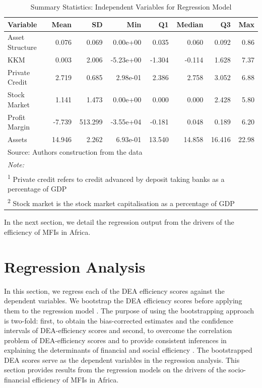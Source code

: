 \documentclass[a4paper, nobind]{templates/ociamthesis}
\begin{document}
\begin{table}

\caption{\label{tab:unnamed-chunk-123}Summary Statistics: Independent Variables for Regression Model}
\centering
\fontsize{9}{11}\selectfont
\begin{tabular}[t]{lrrrrrrr}
\toprule
Variable & Mean & SD & Min & Q1 & Median & Q3 & Max\\
\midrule
Asset Structure & 0.076 & 0.069 & 0.00e+00 & 0.035 & 0.060 & 0.092 & 0.86\\
KKM & 0.003 & 2.006 & -5.23e+00 & -1.304 & -0.114 & 1.628 & 7.37\\
Private Credit & 2.719 & 0.685 & 2.98e-01 & 2.386 & 2.758 & 3.052 & 6.88\\
Stock Market & 1.141 & 1.473 & 0.00e+00 & 0.000 & 0.000 & 2.428 & 5.80\\
Profit Margin & -7.739 & 513.299 & -3.55e+04 & -0.181 & 0.048 & 0.189 & 6.20\\
\addlinespace
Assets & 14.946 & 2.262 & 6.93e-01 & 13.540 & 14.858 & 16.416 & 22.98\\
\bottomrule
\multicolumn{8}{l}{\rule{0pt}{1em}Source: Authors construction from the data}\\
\multicolumn{8}{l}{\rule{0pt}{1em}\textit{Note: }}\\
\multicolumn{8}{l}{\rule{0pt}{1em}\textsuperscript{1} Private credit refers to credit advanced by deposit taking banks as a percentage of GDP}\\
\multicolumn{8}{l}{\rule{0pt}{1em}\textsuperscript{2} Stock market is the stock market capitalisation as a percentage of GDP}\\
\end{tabular}
\end{table}

In the next section, we detail the regression output from the drivers of the efficiency of MFIs in Africa.

\hypertarget{regression-analysis-1}{%
\section{Regression Analysis}\label{regression-analysis-1}}

In this section, we regress each of the DEA efficiency scores against the dependent variables. We bootstrap the DEA efficiency scores before applying them to the regression model \autocite{simar2000general,tziogkidis2012bootstrap,fethi2010assessing}. The purpose of using the bootstrapping approach is two-fold: first, to obtain the bias-corrected estimates and the confidence intervals of DEA-efficiency scores and second, to overcome the correlation problem of DEA-efficiency scores and to provide consistent inferences in explaining the determinants of financial and social efficiency \autocite{assaf2010improving}. The bootstrapped DEA scores serve as the dependent variables in the regression analysis. This section provides results from the regression models on the drivers of the socio-financial efficiency of MFIs in Africa.
\end{document}
